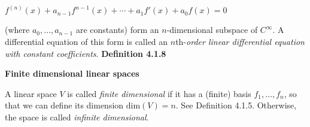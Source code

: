 \par\noindent\begin{center}$f^{(n)}(x)+a_{n-1}f^{n-1}(x)+\cdots{}+a_{1}f'(x)+a_{0}f(x)=0$\end{center}
\par\noindent (where $a_{0},\ldots{},a_{n-1}$ are constants) form an $n$-dimensional subspace of $C^{\infty}$. A differential equation of this form is called an $n$th-\textit{order linear differential equation with constant coefficients}.
\textbf{Definition 4.1.8}\\
\par\noindent\textbf{Finite dimensional linear spaces}
\par\noindent A linear space $V$ is called \textit{finite dimensional} if it has a (finite) basis $f_{1},\ldots{},f_{n}$, so that we can define its dimension $\textrm{dim}(V)=n$. See Definition 4.1.5. Otherwise, the space is called \textit{infinite dimensional}.

